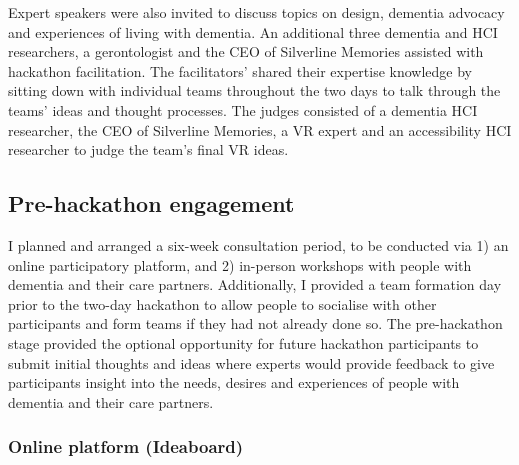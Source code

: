 Expert speakers were also invited to discuss topics on design, dementia advocacy and experiences of living with dementia. An additional three dementia and HCI researchers, a gerontologist and the CEO of Silverline Memories assisted with hackathon facilitation. The facilitators' shared their expertise knowledge by sitting down with individual teams throughout the two days to talk through the teams' ideas and thought processes. The judges consisted of a dementia HCI researcher, the CEO of Silverline Memories, a VR expert and an accessibility HCI researcher to judge the team's final VR ideas.

\pagebreak
\subsection{Pre-hackathon engagement}
\label{sec:EventPrehackathon}
I planned and arranged a six-week consultation period, to be conducted via 1) an online participatory platform, and 2) in-person workshops with people with dementia and their care partners. Additionally, I provided a team formation day prior to the two-day hackathon to allow people to socialise with other participants and form teams if they had not already done so. The pre-hackathon stage provided the optional opportunity for future hackathon participants to submit initial thoughts and ideas where experts would provide feedback to give participants insight into the needs, desires and experiences of people with dementia and their care partners. 

\subsubsection{Online platform (Ideaboard)}
\label{sec:Ideaboard}

